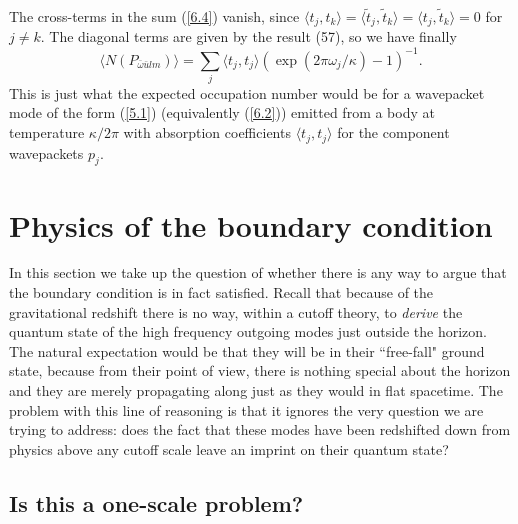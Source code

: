 \documentclass[12pt]{article}
\def\o{\omega}
\def\obar{\bar{\omega}}
\def\ubar{\bar{u}}
\def\la{\langle}
\def\ra{\rangle}
\begin{document}
The cross-terms in the sum (\ref{6.4}) vanish, since
$\la t_j,t_k\ra=\la\widetilde{t}_j,\widetilde{t}_k\ra=
\la t_j,\widetilde{t}_k\ra=0$ for $j\ne k$.
The diagonal terms are given by the result (57), so we have
finally
\begin{equation} \la N(P_{\obar\ubar lm})\ra=
\sum_j \la t_j,t_j\ra(\exp(2\pi\o_j/\kappa)-1)^{-1}.
\end{equation}
This is just what the expected occupation number would be
for a wavepacket mode of the form (\ref{5.1}) (equivalently
(\ref{6.2})) emitted from a body at temperature $\kappa/2\pi$
with absorption coefficients
$\la t_j,t_j\ra$
for the component wavepackets $p_j$.


\section{Physics of the boundary condition}
\label{sec:6}

In this section we take up the question of
whether there is any way to argue that the
boundary condition is in fact satisfied.
Recall that because of the gravitational redshift
there is no way, within a cutoff theory, to
{\it derive} the quantum state of the high
frequency outgoing modes just outside
the horizon.
The natural expectation would be that they will be in their
``free-fall" ground state, because from their
point of view, there is nothing special about the
horizon and they are merely propagating along just
as they would in flat spacetime. The problem with
this line of reasoning is that it ignores the very
question we are trying to address: does the fact
that these modes have been redshifted down from
physics above any cutoff scale leave an imprint
on their quantum state?


\subsection{Is this a one-scale problem?}
\end{document}

